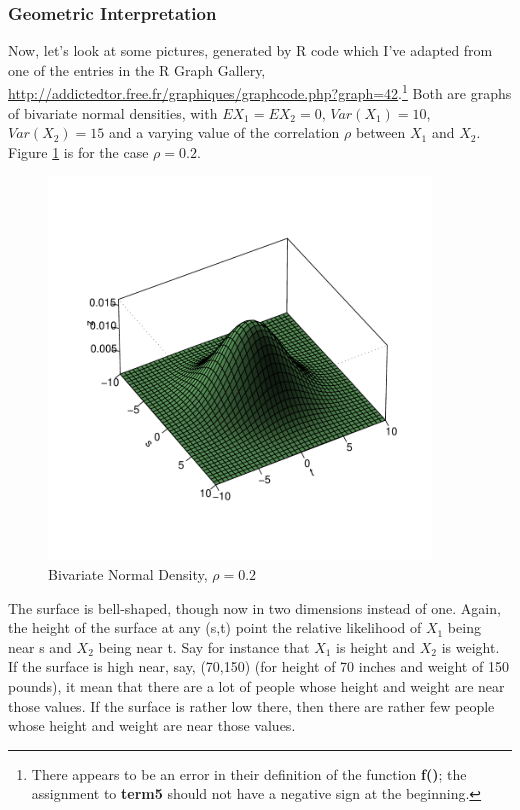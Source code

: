 \subsubsection{Geometric Interpretation}

Now, let's look at some pictures, generated by R code which I've adapted
from one of the entries in the R Graph Gallery,
\url{http://addictedtor.free.fr/graphiques/graphcode.php?graph=42}.\footnote{There
appears to be an error in their definition of the function {\bf f()}; the
assignment to {\bf term5} should not have a negative sign at the
beginning.} Both are graphs of bivariate normal densities, with $EX_1 =
EX_2 = 0$, $Var(X_1) = 10$, $Var(X_2) = 15$ and a varying value of the
correlation $\rho$ between $X_1$ and $X_2$.  Figure \ref{rho2} is for
the case $\rho = 0.2$.


\begin{figure}
\centerline{
\includegraphics[width=4in]{Rho2.pdf}
}
\caption{Bivariate Normal Density, $\rho=0.2$}
\label{rho2}
\end{figure}

The surface is bell-shaped, though now in two dimensions instead of one.
Again, the height of the surface at any (s,t) point the relative
likelihood of $X_1$ being near s and $X_2$ being near t.  Say for
instance that $X_1$ is height and $X_2$ is weight.  If the surface is
high near, say, (70,150) (for height of 70 inches and weight of 150
pounds), it mean that there are a lot of people whose height and weight
are near those values.  If the surface is rather low there, then there
are rather few people whose height and weight are near those values.


